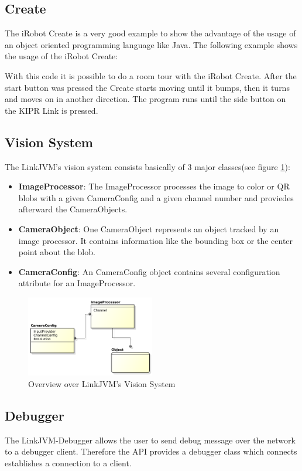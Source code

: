 \documentclass{juniorjournal}
\begin{document}
\subsection{Create}
The iRobot Create is a very good example to show the advantage of the usage of 
an object oriented programming language like Java\cite{Java}.
The following example shows the usage of the iRobot Create:

With this code it is possible to do a room tour with the iRobot Create.
After the start button was pressed the Create starts moving until it bumps, then 
it turns and moves on in another direction. The program runs until the side 
button on the KIPR\cite{KIPR} Link is pressed.

\subsection{Vision System}
The LinkJVM's vision system consists basically of 3 major classes(see figure \ref{fig:Vision-System}):
\begin{itemize}
	\item {\bf ImageProcessor}: The ImageProcessor processes the image to color or QR blobs with a given CameraConfig and a given channel number and proviedes afterward the CameraObjects. 
	\item {\bf CameraObject}: One CameraObject represents an object tracked by an image processor. It contains information like the bounding box or the center point about the blob.
	\item {\bf CameraConfig}: An CameraConfig object contains several configuration attribute for an ImageProcessor.
\end{itemize}
\begin{figure}[H]
\centering
\includegraphics[width=0.5\textwidth]{images/vision.pdf}
\caption{Overview over LinkJVM's Vision System}
\label{fig:Vision-System}
\end{figure}


\subsection{Debugger}
The LinkJVM-Debugger allows the user to send debug message over the network to a debugger client.
Therefore the API provides a debugger class which connects establishes a connection to a client.

\end{document}
